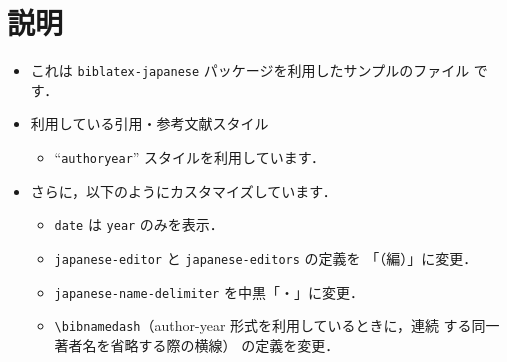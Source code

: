 \documentclass[10pt]{jlreq}
\renewcommand{\bibnamedash}{%
  \hskip.2em \leavevmode\rule[.5ex]{2.5em}{.3pt}\hskip0.4em}
\begin{document}
\section{説明}

\begin{itemize}
 \item これは \texttt{biblatex-japanese} パッケージを利用したサンプルのファイル
       です．
 \item 利用している引用・参考文献スタイル
       \begin{itemize}
        \item ``\texttt{authoryear}'' スタイルを利用しています．
       \end{itemize}
 \item さらに，以下のようにカスタマイズしています．
       \begin{itemize}
        \item \texttt{date} は \texttt{year} のみを表示．
        \item \texttt{japanese-editor} と \texttt{japanese-editors} の定義を
              「（編）」に変更．
        \item \texttt{japanese-name-delimiter} を中黒「・」に変更．
        \item \verb|\bibnamedash|（author-year 形式を利用しているときに，連続
              する同一著者名を省略する際の横線） の定義を変更．
       \end{itemize}
\end{itemize}


\end{document}
